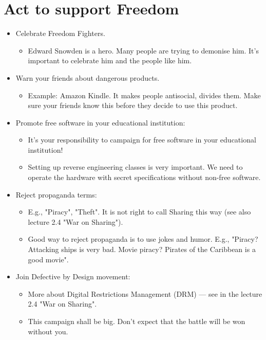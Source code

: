 \documentclass[twoside,openright]{report}
\begin{document}
\section{Act to support Freedom}
\begin{itemize}
 \item    Celebrate Freedom Fighters.
\begin{itemize}
 \item        Edward Snowden is a hero. Many people are trying to demonise him. It's important to celebrate him and the people like him.
\end{itemize}
 \item    Warn your friends about dangerous products.
\begin{itemize}
 \item        Example: Amazon Kindle. It makes people antisocial, divides them. Make sure your friends know this before they decide to use this product.
 \end{itemize}
 \item    Promote free software in your educational institution:
 \begin{itemize}
 \item        It's your responsibility to campaign for free software in your educational institution!
 \item        Setting up reverse engineering classes is very important. We need to operate the hardware with secret specifications without non-free software.
 \end{itemize}
 \item    Reject propaganda terms: 
 \begin{itemize}
 \item        E.g., "Piracy", "Theft". It is not right to call Sharing this way (see also lecture 2.4 "War on Sharing").
 \item        Good way to reject propaganda is to use jokes and humor. E.g., "Piracy? Attacking ships is very bad. Movie piracy? Pirates of the Caribbean is a good movie".
 \end{itemize}
 \item    Join Defective by Design movement:
 \begin{itemize}
 \item        More about Digital Restrictions Management (DRM) --- see in the lecture 2.4 "War on Sharing". 
 \item        This campaign shall be big. Don't expect that the battle will be won without you.

\end{itemize}
\end{itemize}
\end{document}
